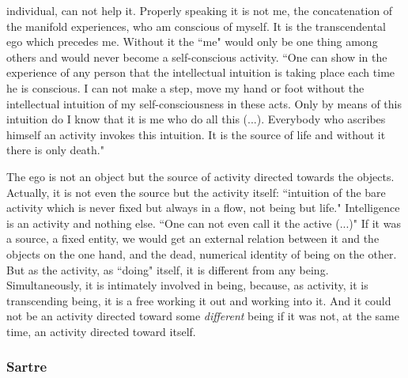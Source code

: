 individual, can not help it. Properly speaking it is not me, the concatenation of the manifold experiences, who am 
conscious of myself. It is the transcendental ego which precedes me. Without it the ``me" would only be one thing 
among others and would never become a self-conscious activity. ``One can show in the experience of any person that 
the intellectual intuition is taking place each time he is conscious. I can not make a step, move my hand or foot 
without the intellectual intuition of my self-consciousness in these acts. Only by means of this intuition do I 
know that it is me who do all this (...). Everybody who ascribes himself an activity invokes this intuition. It is 
the source of life and without it there is only death." \cite{ITS}  

The ego is not an object but the source of activity directed towards the objects. Actually, it is not even  the 
source but the activity itself: ``intuition of the bare activity which is never fixed but always in a flow, not being 
but life." \cite{ITS} Intelligence is an activity and nothing else. ``One can not even call it the active (...)" \cite{ITS} If it was a source, 
a fixed entity, we would get an external relation between it and the objects on the one hand, and the dead, numerical 
identity of being on the other. But as the activity, as ``doing" itself, it is different from any being. Simultaneously, 
it is intimately involved in being, because, as activity, it is transcending being, it is a free working it out and 
working into it. And it could not be an activity directed toward some {\em different}
being if it was not, at the same time, an activity 
directed toward itself.


\subsubsection{ Sartre}\label{empSartre}

